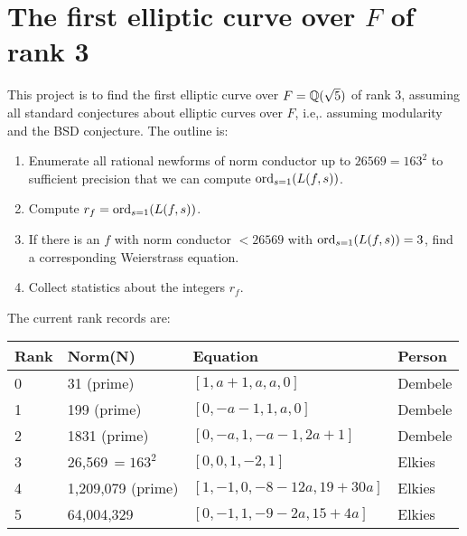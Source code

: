 \documentclass{article}
\begin{document}
\section{The first elliptic curve over $F$ of  rank 3}
This project is to find the first elliptic curve over $F=\mathbb{Q}(\sqrt{5})$
of rank 3, assuming all standard conjectures about elliptic curves
over $F$, i.e,. assuming modularity and the BSD conjecture.  The
outline is:
\begin{enumerate}
\item Enumerate all rational newforms of norm conductor up to $26569=163^2$ to
sufficient precision that we can compute $\operatorname{ord}_{s=1}(L(f,s))$.
\item Compute $r_f = \operatorname{ord}_{s=1}(L(f,s))$.
\item If there is an $f$ with norm conductor $<26569$ with $\operatorname{ord}_{s=1}(L(f,s))=3$, find a corresponding Weierstrass equation.
\item Collect statistics about the integers $r_f$.
\end{enumerate}
The current rank records are:
\begin{center}
\begin{tabular}{|l|l|l|l|}\hline
Rank & Norm(N) & Equation & Person\\\hline
0 & 31 (prime) &  $[1,a+1,a,a,0]$ &  Dembele \\
1 & 199 (prime) &  $[0,-a-1,1,a,0]$ &  Dembele \\
2 & 1831 (prime) &  $[0,-a,1,-a-1,2a+1]$ & Dembele \\
3 & 26,569$\,=163^2$ &  $[0,0,1,-2,1]$ & Elkies \\
4 & 1,209,079 (prime) & $[1, -1, 0, -8-12a, 19+30a]$ & Elkies \\
5 & 64,004,329 & $[0, -1, 1, -9-2a, 15+4a]$ & Elkies
\\\hline
\end{tabular}
\end{center}
\end{document}
